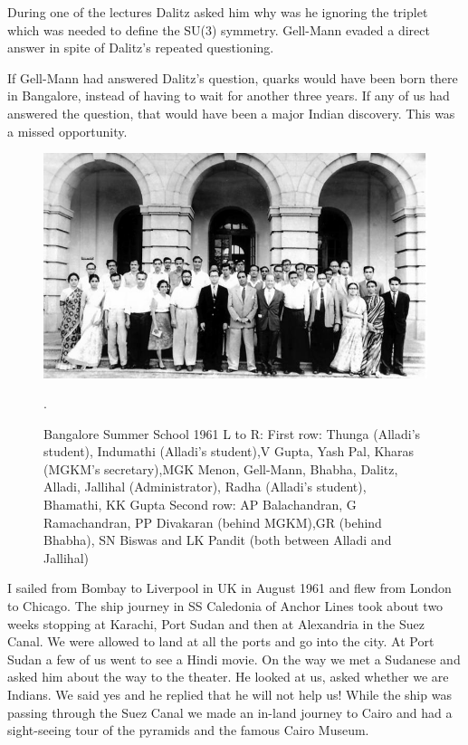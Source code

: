 During one of the lectures Dalitz asked him why was he ignoring the 
triplet which was needed to define the SU(3) symmetry. Gell-Mann evaded 
a direct answer in spite of Dalitz's repeated questioning.

If Gell-Mann had answered Dalitz's question, quarks would have been born 
there in Bangalore, instead of having to wait for another three years. 
If any of us had answered the question, that would have been a major 
Indian discovery. This was a missed opportunity.
\begin{figure}[h]
\centering
\includegraphics[width=\textwidth]{images/Rajaji-gellmann.jpg}
\caption{Bangalore Summer School 1961
L to R: First row: Thunga (Alladi's student), Indumathi (Alladi's
student),V Gupta, Yash Pal, Kharas (MGKM's secretary),MGK Menon,
Gell-Mann, Bhabha, Dalitz, Alladi, Jallihal (Administrator),
Radha (Alladi's student), Bhamathi, KK Gupta
Second row: AP Balachandran, G Ramachandran, PP Divakaran (behind
MGKM),GR (behind Bhabha), SN Biswas and LK Pandit (both between
Alladi and Jallihal)}.
\end{figure}
 
I sailed from Bombay to Liverpool in UK in August 1961 and flew from 
London to Chicago. The ship journey in SS Caledonia of Anchor Lines took 
about two weeks stopping at Karachi, Port Sudan and then at Alexandria 
in the Suez Canal. We were allowed to land at all the ports and go into 
the city. At Port Sudan a few of us went to see a Hindi movie. On the 
way we met a Sudanese and asked him about the way to the theater. He 
looked at us, asked whether we are Indians. We said yes and he replied 
that he will not help us! While the ship was passing through the Suez 
Canal we made an in-land journey to Cairo and had a sight-seeing tour of 
the pyramids and the famous Cairo Museum.

